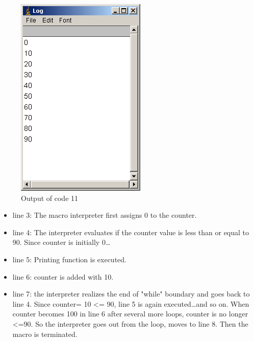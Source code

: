 \begin{figure}[htbp]
\begin{center}
\includegraphics[scale=0.4]{fig/fig2331_Code11out.png}
\caption{Output of code 11}
\label{fig:code11 output}
\end{center}
\end{figure} 

\begin{itemize}
\item line 3: The macro interpreter first assigns 0 to the counter.
\item line 4: The interpreter evaluates if the counter value is less than or equal to 90. Since counter is initially 0\ldots 
\item line 5: Printing function is executed. 
\item line 6: counter is added with 10. 
\item line 7: the interpreter realizes the end of "while" boundary and goes back to line 4. Since counter= 10 <= 90, line 5 is again executed\ldots and so on. When counter becomes 100 in line 6 after several more loops, counter is no longer <=90. So the interpreter goes out from the loop, moves to line 8. Then the macro is terminated.
\end{itemize}

